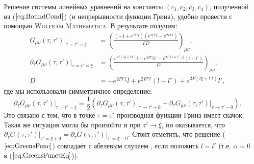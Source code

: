 Решение системы линейных уравнений на константы $(c_1,c_2,c_3,c_4)$, полученной из ($\ref{eq:BoundCond}$) (и непрерывности функции Грина), удобно провести с помощью \textsc{Wolfram Mathematica}. В результате получим:
\begin{equation}
	\label{eq:GreensFunc}
	\begin{split}
		G_{\mu \nu}(\tau, \tau')\Big|_{\tau=\tau'=\xi}&=\left(\frac{\left( -1 + e^{2 Fl\xi} \right)\left( e^{2Fl'\xi} - e^{2Fl't} \right)}{F D}\right)_{\mu \nu},\\
		\partial_\tau G_{\mu \nu}(\tau,\tau')\Big|_{\tau=\tau'=\xi} &= \left(\frac{e^{2 F (l \xi +l' t)}l + e^{2 F l' \xi}l' - e^{2 F(l+l')\xi}(l+l')}{D}\right)_{\mu \nu},\\
		D &= -e^{2 F l'\xi}l + e^{2 F l' t}(l-l') + e^{2 F(l\xi +l't)}l',
	\end{split}
\end{equation}
где мы использовали симметричное определение:
\begin{equation*}
	\partial_\tau G_{\mu \nu}(\tau,\tau')\Big|_{\tau=\tau'=\xi}=\frac 12 \left(\partial_\tau G_{\mu \nu}(\tau,\tau')\Big|_{\tau\to\tau'+0} + \partial_\tau G_{\mu \nu}(\tau,\tau')\Big|_{\tau\to \tau'-0}\right).
\end{equation*}
Это связано с тем, что в точке $\tau=\tau'$ производная функции Грина имеет скачок. Такая же ситуация могла бы произойти и при $\tau'\to \xi$, но оказывается, что $\partial_\tau G(\tau,\tau')\Big|_{\tau'=\xi+0}=\partial_\tau G(\tau,\tau')\Big|_{\tau'=\xi-0}$. Стоит отметить, что решение ($\ref{eq:GreensFunc}$) совпадает с абелевым случаем \cite{Mnev}, если положить $l=l'$ (т.е. $\alpha=0$ в ($\ref{eq:GreensFunctEq}$)).